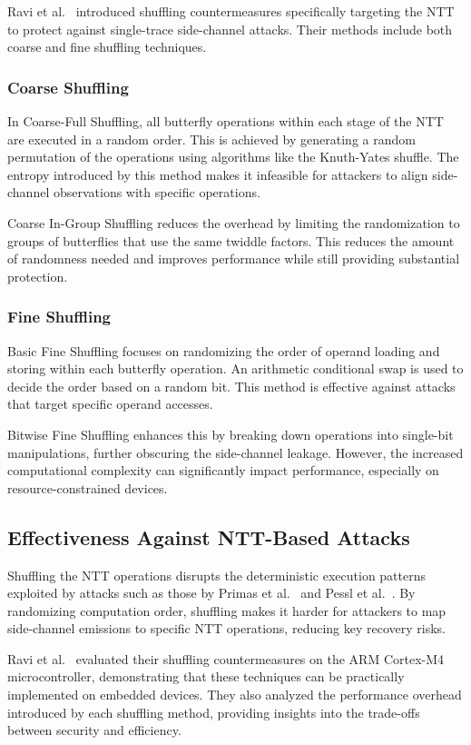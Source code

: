 Ravi et al.~\cite{Ravi20} introduced shuffling countermeasures specifically targeting the \ac{NTT} to protect against single-trace side-channel attacks. Their methods include both coarse and fine shuffling techniques.


\subsubsection{Coarse Shuffling}

In Coarse-Full Shuffling, all butterfly operations within each stage of the \ac{NTT} are executed in a random order. This is achieved by generating a random permutation of the operations using algorithms like the Knuth-Yates shuffle. The entropy introduced by this method makes it infeasible for attackers to align side-channel observations with specific operations.

Coarse In-Group Shuffling reduces the overhead by limiting the randomization to groups of butterflies that use the same twiddle factors. This reduces the amount of randomness needed and improves performance while still providing substantial protection.

\subsubsection{Fine Shuffling}

Basic Fine Shuffling focuses on randomizing the order of operand loading and storing within each butterfly operation. An arithmetic conditional swap is used to decide the order based on a random bit. This method is effective against attacks that target specific operand accesses.

Bitwise Fine Shuffling enhances this by breaking down operations into single-bit manipulations, further obscuring the side-channel leakage. However, the increased computational complexity can significantly impact performance, especially on resource-constrained devices.

\subsection{Effectiveness Against NTT-Based Attacks}

Shuffling the \ac{NTT} operations disrupts the deterministic execution patterns exploited by attacks such as those by Primas et al.~\cite{Primas17} and Pessl et al.~\cite{Pessl19}. By randomizing computation order, shuffling makes it harder for attackers to map side-channel emissions to specific \ac{NTT} operations, reducing key recovery risks.

Ravi et al.~\cite{Ravi20} evaluated their shuffling countermeasures on the ARM Cortex-M4 microcontroller, demonstrating that these techniques can be practically implemented on embedded devices. They also analyzed the performance overhead introduced by each shuffling method, providing insights into the trade-offs between security and efficiency.
